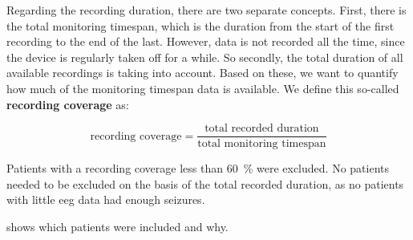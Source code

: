 Regarding the recording duration, there are two separate concepts.
First, there is the total monitoring timespan, which is the duration from the start of the first recording to the end of the last.
However, data is not recorded all the time, since the device is regularly taken off for a while.
So secondly, the total duration of all available recordings is taking into account.
Based on these, we want to quantify how much of the monitoring timespan data is available.
We define this so-called \textbf{recording coverage} as:

\[\text{recording coverage} = \frac{\text{total recorded duration}}{\text{total monitoring timespan}}\]

Patients with a recording coverage less than \SI{60}{\percent} were excluded.
No patients needed to be excluded on the basis of the total recorded duration, as no patients with little \gls{eeg} data had enough seizures.

 shows which patients were included and why.

\begin{table}[hptb]
    \centering
    \setlength{\tabcolsep}{9pt}
    \renewcommand{\arraystretch}{1.15}
    
    \caption[Patient Inclusion]{Patient Inclusion: shows which inclusion criteria were met for which patients. Next to the valid seizures ($\geq 10$) and recording coverage ($\geq\SI{60}{\percent}$) conditions is denoted whether they were met.}
    \label{tab:patient_inclusion}
\end{table}



